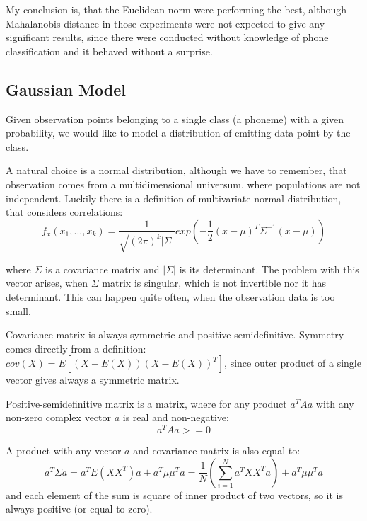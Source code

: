 \documentclass[12pt,a4paper,english]{article}
\begin{document}
My conclusion is, that the Euclidean norm were performing the best, although Mahalanobis distance in those experiments were not expected to give any significant results, since there were conducted without knowledge of phone classification and it behaved without a surprise. \newline

\newpage
\subsection{Gaussian Model}

Given observation points belonging to a single class (a phoneme) with a given probability,
we would like to model a distribution of emitting data point by the class. \newline


A natural choice is a normal distribution, although we have to remember, that observation comes from a multidimensional universum, where populations are not independent. \newline
Luckily there is a definition of multivariate normal distribution, that considers correlations:
\begin{equation}
    f_x(x_1,...,x_k) = \frac{1}{\sqrt{(2\pi)^k |{\Sigma}| }}exp(-\frac{1}{2}(x-\mu)^T{\Sigma}^{-1}(x-\mu))
\end{equation}
                       
where $\Sigma$ is a covariance matrix and $|\Sigma|$ is its determinant. \newline
The problem with this vector arises, when $\Sigma$ matrix is singular, which is not invertible nor it has determinant. This can happen quite often, when the observation data is too small. \newline

Covariance matrix is always symmetric and positive-semidefinitive.\newline
Symmetry comes directly from a definition: $cov(X) = E[(X - E(X))(X - E(X))^T]$, since outer product of a single vector gives always a symmetric matrix. \newline

Positive-semidefinitive matrix is a matrix, where for any product $a^T A a$ with any non-zero complex vector $a$ is real and non-negative:
\begin{equation}
    a^T A a >= 0
\end{equation}

A product with any vector $a$ and covariance matrix is also equal to: 
\begin{equation}
    a^T \Sigma a = a^T E(XX^T) a + a^T\mu\mu^T a = \frac 1 N (\sum_{i=1}^N a^T X X^T a) + a^T\mu\mu^T a
\end{equation}
and each element of the sum is square of inner product of two vectors, so it is always positive (or equal to zero). \newline
\end{document}
